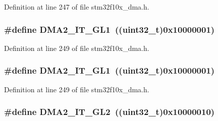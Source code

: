 Definition at line 247 of file stm32f10x\+\_\+dma.\+h.

\subsubsection[{\texorpdfstring{D\+M\+A2\+\_\+\+I\+T\+\_\+\+G\+L1}{DMA2_IT_GL1}}]{\setlength{\rightskip}{0pt plus 5cm}\#define D\+M\+A2\+\_\+\+I\+T\+\_\+\+G\+L1~(({\bf uint32\+\_\+t})0x10000001)}\hypertarget{group___d_m_a__interrupts__definition_gafe096e037c0b7cc498cdb993d32e06c5}{}\label{group___d_m_a__interrupts__definition_gafe096e037c0b7cc498cdb993d32e06c5}


Definition at line 249 of file stm32f10x\+\_\+dma.\+h.

\subsubsection[{\texorpdfstring{D\+M\+A2\+\_\+\+I\+T\+\_\+\+G\+L1}{DMA2_IT_GL1}}]{\setlength{\rightskip}{0pt plus 5cm}\#define D\+M\+A2\+\_\+\+I\+T\+\_\+\+G\+L1~(({\bf uint32\+\_\+t})0x10000001)}\hypertarget{group___d_m_a__interrupts__definition_gafe096e037c0b7cc498cdb993d32e06c5}{}\label{group___d_m_a__interrupts__definition_gafe096e037c0b7cc498cdb993d32e06c5}


Definition at line 249 of file stm32f10x\+\_\+dma.\+h.

\subsubsection[{\texorpdfstring{D\+M\+A2\+\_\+\+I\+T\+\_\+\+G\+L2}{DMA2_IT_GL2}}]{\setlength{\rightskip}{0pt plus 5cm}\#define D\+M\+A2\+\_\+\+I\+T\+\_\+\+G\+L2~(({\bf uint32\+\_\+t})0x10000010)}\hypertarget{group___d_m_a__interrupts__definition_gad1b225f7053b88eeee62e5ed1801b5c3}{}\label{group___d_m_a__interrupts__definition_gad1b225f7053b88eeee62e5ed1801b5c3}


